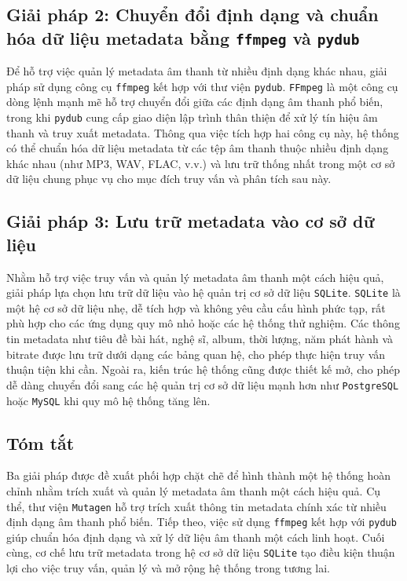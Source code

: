 \documentclass[conference]{IEEEtran}
\begin{document}
\subsection{Giải pháp 2: Chuyển đổi định dạng và chuẩn hóa dữ liệu metadata bằng \texttt{ffmpeg} và \texttt{pydub}}

Để hỗ trợ việc quản lý metadata âm thanh từ nhiều định dạng khác nhau, giải pháp sử dụng công cụ \texttt{ffmpeg} kết hợp với thư viện \texttt{pydub}. \texttt{FFmpeg} là một công cụ dòng lệnh mạnh mẽ hỗ trợ chuyển đổi giữa các định dạng âm thanh phổ biến, trong khi \texttt{pydub} cung cấp giao diện lập trình thân thiện để xử lý tín hiệu âm thanh và truy xuất metadata. Thông qua việc tích hợp hai công cụ này, hệ thống có thể chuẩn hóa dữ liệu metadata từ các tệp âm thanh thuộc nhiều định dạng khác nhau (như MP3, WAV, FLAC, v.v.) và lưu trữ thống nhất trong một cơ sở dữ liệu chung phục vụ cho mục đích truy vấn và phân tích sau này.
\subsection{Giải pháp 3: Lưu trữ metadata vào cơ sở dữ liệu}

Nhằm hỗ trợ việc truy vấn và quản lý metadata âm thanh một cách hiệu quả, giải pháp lựa chọn lưu trữ dữ liệu vào hệ quản trị cơ sở dữ liệu \texttt{SQLite}. \texttt{SQLite} là một hệ cơ sở dữ liệu nhẹ, dễ tích hợp và không yêu cầu cấu hình phức tạp, rất phù hợp cho các ứng dụng quy mô nhỏ hoặc các hệ thống thử nghiệm. Các thông tin metadata như tiêu đề bài hát, nghệ sĩ, album, thời lượng, năm phát hành và bitrate được lưu trữ dưới dạng các bảng quan hệ, cho phép thực hiện truy vấn thuận tiện khi cần. Ngoài ra, kiến trúc hệ thống cũng được thiết kế mở, cho phép dễ dàng chuyển đổi sang các hệ quản trị cơ sở dữ liệu mạnh hơn như \texttt{PostgreSQL} hoặc \texttt{MySQL} khi quy mô hệ thống tăng lên.
\subsection{Tóm tắt}

Ba giải pháp được đề xuất phối hợp chặt chẽ để hình thành một hệ thống hoàn chỉnh nhằm trích xuất và quản lý metadata âm thanh một cách hiệu quả. Cụ thể, thư viện \texttt{Mutagen} hỗ trợ trích xuất thông tin metadata chính xác từ nhiều định dạng âm thanh phổ biến. Tiếp theo, việc sử dụng \texttt{ffmpeg} kết hợp với \texttt{pydub} giúp chuẩn hóa định dạng và xử lý dữ liệu âm thanh một cách linh hoạt. Cuối cùng, cơ chế lưu trữ metadata trong hệ cơ sở dữ liệu \texttt{SQLite} tạo điều kiện thuận lợi cho việc truy vấn, quản lý và mở rộng hệ thống trong tương lai.
\end{document}
